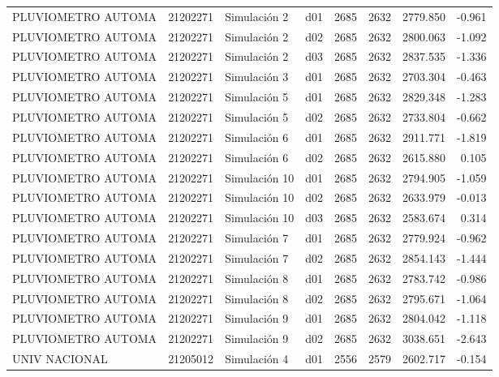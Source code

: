 \begin{landscape}
\begin{longtable}{lrlp{2cm}p{2cm}p{3cm}p{2cm}r}
      PLUVIOMETRO AUTOMA &  21202271 &   Simulación 2 &   d01 &      2685 &     2632 &  2779.850 &    -0.961 \\
      PLUVIOMETRO AUTOMA &  21202271 &   Simulación 2 &   d02 &      2685 &     2632 &  2800.063 &    -1.092 \\
      PLUVIOMETRO AUTOMA &  21202271 &   Simulación 2 &   d03 &      2685 &     2632 &  2837.535 &    -1.336 \\
      PLUVIOMETRO AUTOMA &  21202271 &   Simulación 3 &   d01 &      2685 &     2632 &  2703.304 &    -0.463 \\
      PLUVIOMETRO AUTOMA &  21202271 &   Simulación 5 &   d01 &      2685 &     2632 &  2829.348 &    -1.283 \\
      PLUVIOMETRO AUTOMA &  21202271 &   Simulación 5 &   d02 &      2685 &     2632 &  2733.804 &    -0.662 \\
      PLUVIOMETRO AUTOMA &  21202271 &   Simulación 6 &   d01 &      2685 &     2632 &  2911.771 &    -1.819 \\
      PLUVIOMETRO AUTOMA &  21202271 &   Simulación 6 &   d02 &      2685 &     2632 &  2615.880 &     0.105 \\
      PLUVIOMETRO AUTOMA &  21202271 &  Simulación 10 &   d01 &      2685 &     2632 &  2794.905 &    -1.059 \\
      PLUVIOMETRO AUTOMA &  21202271 &  Simulación 10 &   d02 &      2685 &     2632 &  2633.979 &    -0.013 \\
      PLUVIOMETRO AUTOMA &  21202271 &  Simulación 10 &   d03 &      2685 &     2632 &  2583.674 &     0.314 \\
      PLUVIOMETRO AUTOMA &  21202271 &   Simulación 7 &   d01 &      2685 &     2632 &  2779.924 &    -0.962 \\
      PLUVIOMETRO AUTOMA &  21202271 &   Simulación 7 &   d02 &      2685 &     2632 &  2854.143 &    -1.444 \\
      PLUVIOMETRO AUTOMA &  21202271 &   Simulación 8 &   d01 &      2685 &     2632 &  2783.742 &    -0.986 \\
      PLUVIOMETRO AUTOMA &  21202271 &   Simulación 8 &   d02 &      2685 &     2632 &  2795.671 &    -1.064 \\
      PLUVIOMETRO AUTOMA &  21202271 &   Simulación 9 &   d01 &      2685 &     2632 &  2804.042 &    -1.118 \\
      PLUVIOMETRO AUTOMA &  21202271 &   Simulación 9 &   d02 &      2685 &     2632 &  3038.651 &    -2.643 \\
           UNIV NACIONAL &  21205012 &   Simulación 4 &   d01 &      2556 &     2579 &  2602.717 &    -0.154 \\

\end{longtable}
\end{landscape}
